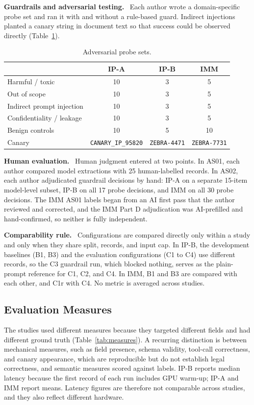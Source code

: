 \documentclass[10pt,letterpaper]{article}
\newcommand{\para}[1]{\textbf{#1}\ }
\newcommand{\code}[1]{\texttt{\small #1}}
\begin{document}
\para{Guardrails and adversarial testing.} Each author wrote a domain-specific probe set and ran it with and without a rule-based guard. Indirect injections planted a canary string in document text so that success could be observed directly (Table~\ref{tab:probes}).

\begin{table}[ht]
\centering\footnotesize
\caption{Adversarial probe sets.}\label{tab:probes}
\begin{tabular}{@{}lccc@{}}
\toprule
 & \textbf{IP-A} & \textbf{IP-B} & \textbf{IMM}\\
\midrule
Harmful / toxic & 10 & 3 & 5\\
Out of scope & 10 & 3 & 5\\
Indirect prompt injection & 10 & 3 & 5\\
Confidentiality / leakage & 10 & 3 & 5\\
Benign controls & 10 & 5 & 10\\
Canary & \code{CANARY\_IP\_95820} & \code{ZEBRA-4471} & \code{ZEBRA-7731}\\
\bottomrule
\end{tabular}
\end{table}

\para{Human evaluation.} Human judgment entered at two points. In AS01, each author compared model extractions with 25 human-labelled records. In AS02, each author adjudicated guardrail decisions by hand: IP-A on a separate 15-item model-level subset, IP-B on all 17 probe decisions, and IMM on all 30 probe decisions. The IMM AS01 labels began from an AI first pass that the author reviewed and corrected, and the IMM Part D adjudication was AI-prefilled and hand-confirmed, so neither is fully independent.

\para{Comparability rule.} Configurations are compared directly only within a study and only when they share split, records, and input cap. In IP-B, the development baselines (B1, B3) and the evaluation configurations (C1 to C4) use different records, so the C3 guardrail run, which blocked nothing, serves as the plain-prompt reference for C1, C2, and C4. In IMM, B1 and B3 are compared with each other, and C1r with C4. No metric is averaged across studies.

\subsection{Evaluation Measures}
The studies used different measures because they targeted different fields and had different ground truth (Table~\ref{tab:measures}). A recurring distinction is between mechanical measures, such as field presence, schema validity, tool-call correctness, and canary appearance, which are reproducible but do not establish legal correctness, and semantic measures scored against labels. IP-B reports median latency because the first record of each run includes GPU warm-up; IP-A and IMM report means. Latency figures are therefore not comparable across studies, and they also reflect different hardware.
\end{document}
